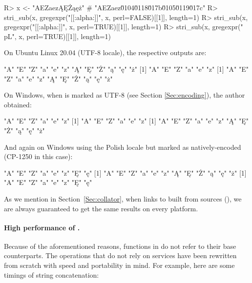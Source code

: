 \documentclass[nojss]{jss}
\begin{document}
\begin{Schunk}
\begin{Sinput}
R> x <- "AEZaezĄĘŻąęż"  # "AEZaez\u0104\u0118\u017b\u0105\u0119\u017c"
R> stri_sub(x, gregexpr("[[:alpha:]]", x, perl=FALSE)[[1]], length=1)
R> stri_sub(x, gregexpr("[[:alpha:]]", x, perl=TRUE)[[1]],  length=1)
R> stri_sub(x, gregexpr("\\p{L}", x, perl=TRUE)[[1]],       length=1)
\end{Sinput}
\end{Schunk}

On Ubuntu Linux 20.04 (UTF-8 locale), the respective outputs are:

\begin{Schunk}
\begin{Soutput}
[1] "A" "E" "Z" "a" "e" "z" "Ą" "Ę" "Ż" "ą" "ę" "ż"
[1] "A" "E" "Z" "a" "e" "z"
[1] "A" "E" "Z" "a" "e" "z" "Ą" "Ę" "Ż" "ą" "ę" "ż"
\end{Soutput}
\end{Schunk}

On Windows, when  is marked as UTF-8
(see Section \ref{Sec:encoding}), the author obtained:

\begin{Schunk}
\begin{Soutput}
[1] "A" "E" "Z" "a" "e" "z"
[1] "A" "E" "Z" "a" "e" "z"
[1] "A" "E" "Z" "a" "e" "z" "Ą" "Ę" "Ż" "ą" "ę" "ż"
\end{Soutput}
\end{Schunk}

And again on Windows using the Polish locale
but  marked as natively-encoded (CP-1250 in this case):

\begin{Schunk}
\begin{Soutput}
[1] "A" "E" "Z" "a" "e" "z" "Ę" "ę"
[1] "A" "E" "Z" "a" "e" "z" "Ą" "Ę" "Ż" "ą" "ę" "ż"
[1] "A" "E" "Z" "a" "e" "z" "Ę" "ę"
\end{Soutput}
\end{Schunk}

As we mention in Section~\ref{Sec:collator},
when  links to  built from sources
(),
we are always guaranteed to get the same results on every platform.




\paragraph{High performance of .}
Because of the aforementioned reasons, functions in 
do not refer to their  base  counterparts.
The operations that do not rely on  services
have been rewritten from scratch with speed and portability in mind.
For example, here are some timings of string concatenation:
\end{document}
